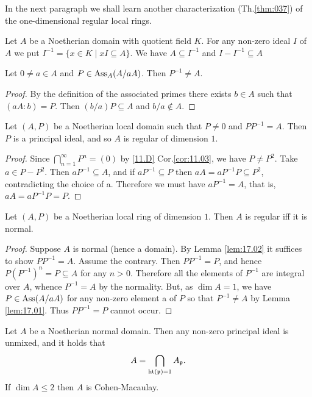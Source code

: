 \documentclass[../main]{subfiles}
\begin{document}
In the next paragraph we shall learn another characterization (Th.\ref{thm:037}) of the one-dimensional regular local rings.

\newparagraph Let $A$ be a Noetherian domain with quotient field $K$. For any non-zero ideal $I$ of $A$ we put $I^{-1}=\{x \in K \mid x I \subseteq A\}$. We have $A \subseteq I^{-1}$ and $I-I^{-1} \subseteq A$

\begin{lemma}\label{lem:17.01}
Let $0 \neq a \in A$ and $P \in \operatorname{Ass}_A(A/aA)$. Then $P^{-1} \neq A$.
\end{lemma} 
\begin{proof}
By the definition of the associated primes there exists $b \in A$ such that $(a A: b)=P$. Then $(b / a) P \subseteq A$ and $b/a \notin A$.
\end{proof}

\begin{lemma}\label{lem:17.02}
Let $(A, P)$ be a Noetherian local domain such that $P \neq 0$ and $P P^{-1}=A$. Then $P$ is a principal ideal, and so $A$ is regular of dimension $1$.
\end{lemma} 
\begin{proof}
Since $\bigcap_{n=1}^{\infty} P^n=(0)$ by \ref{11.D} Cor.\ref{cor:11.03}, we have $P \neq P^2$. Take \newline $a\in P-P^2$. Then $aP^{-1} \subseteq A$, and if $aP^{-1} \subseteq P$ then $aA=a P^{-1} P \subseteq P^2$, contradicting the choice of a. Therefore we must have $aP^{-1}=A$, that is, \newline $aA=aP^{-1} P=P$.
\end{proof}

\begin{theorem}\label{thm:037}
   Let $(A, P)$ be a Noetherian local ring of dimension $1$. Then $A$ is regular iff it is normal.
\end{theorem}
\begin{proof}
Suppose $A$ is normal (hence a domain). By Lemma \ref{lem:17.02} it suffices to show $PP^{-1}=A$. Assume the contrary. Then $PP^{-1}=P$, and hence\newline $P(P^{-1})^n=P \subseteq A$ for any $n>0$. Therefore all the elements of $P^{-1}$ are integral over $A$, whence $P^{-1}=A$ by the normality. But, as $\dim A=1$, we have $P \in \operatorname{Ass}(A / aA)$ for any non-zero element a of $P$ so that $P^{-1} \neq A$ by Lemma \ref{lem:17.01}. Thus $PP^{-1}=P$ cannot occur.
\end{proof}

\begin{theorem}\label{thm:038}
   Let $A$ be a Noetherian normal domain. Then any non-zero principal ideal is unmixed, and it holds that \[A=\bigcap_{\operatorname{ht}(\mathfrak{p})=1} A_{\mathfrak{p}}.\] If $\dim A \leqslant 2$ then $A$ is Cohen-Macaulay.
\end{theorem}
\end{document}
